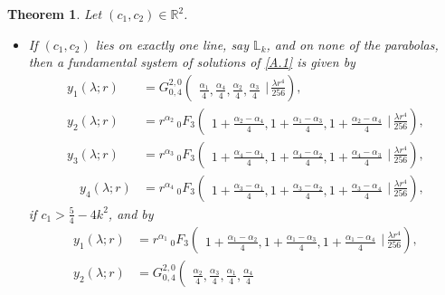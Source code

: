 \documentclass[reqno,11pt,centertags]{amsart}
\newcommand{\bbR}{{\mathbb{R}}}
\newcommand{\<}{\langle}
\renewcommand{\>}{\rangle}
\newcommand{\lb}{\label}
\numberwithin{equation}{section}
\newtheorem{theorem}{Theorem}[section]
\theoremstyle{definition}
\def\d{\displaystyle}
\begin{document}
\begin{theorem} \lb{tA.3} 
Let $(c_1,c_2)\in \bbR^2$.
\begin{itemize}
\item[(a)] If $(c_1,c_2)$ lies on exactly one  line, say $\mathbb{L}_k$,   and   on none of the parabolas, then a fundamental system of solutions of \eqref{A.1} is given by 
\begin{align}
y_1(\lambda;r)&=G_{0,4}^{2,0}\left(\!\begin{array}{c}\\
{\frac{\alpha_1}{4},\frac{\alpha_4}{4}, \frac{\alpha_2}{4},\frac{\alpha_3}{4}}
\end{array} \bigg\vert\,   \frac{\lambda r^4}{256} \right),\\
y_2(\lambda;r)&=r^{\alpha_2} \,_{0} F_3\left(\!\begin{array}{c}\\
{ 1+\frac{\alpha_2-\alpha_4}{4}, 1+\frac{\alpha_1-\alpha_3}{4}, 1+\frac{\alpha_2-\alpha_4}{4}}
\end{array} \bigg\vert\,  \frac{\lambda r^4}{256} \right),\\
y_3(\lambda;r)&=r^{\alpha_3} \,_{0} F_3\left(\!\begin{array}{c}\\
{ 1+\frac{\alpha_4-\alpha_1}{4}, 1+\frac{\alpha_4-\alpha_2}{4}, 1+\frac{\alpha_4-\alpha_3}{4}}
\end{array} \bigg\vert\,  \frac{\lambda r^4}{256} \right),\\
\quad y_4(\lambda;r)&=r^{\alpha_4} \,_{0} F_3\left(\!\begin{array}{c}\\
{ 1+\frac{\alpha_3-\alpha_1}{4}, 1+\frac{\alpha_3-\alpha_2}{4}, 1+\frac{\alpha_3-\alpha_4}{4}}
\end{array} \bigg\vert\,  \frac{\lambda r^4}{256} \right), 
\end{align}
if $\d c_1>\frac{5}{4}- 4k^2$, and by 
\begin{align}
y_1(\lambda;r)&=r^{\alpha_1} \,_{0} F_3\left(\!\begin{array}{c}\\
{ 1+\frac{\alpha_1-\alpha_2}{4}, 1+\frac{\alpha_1-\alpha_3}{4}, 1+\frac{\alpha_1-\alpha_4}{4}}
\end{array} \bigg\vert\,  \frac{\lambda r^4}{256} \right),\\
y_2(\lambda;r)&=G_{0,4}^{2,0}\left(\!\begin{array}{c}\\
{\frac{\alpha_2}{4},\frac{\alpha_3}{4}, \frac{\alpha_1}{4},\frac{\alpha_4}{4}}

\end{array}
\end{align}
\end{itemize}
\end{theorem}
\end{document}
